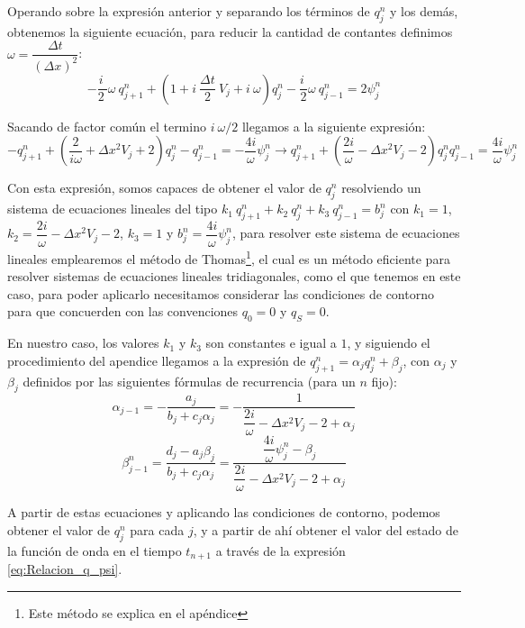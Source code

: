 \documentclass[10pt,onecolumn]{article}
\begin{document}
Operando sobre la expresión anterior y separando los términos de $q^n_j$ y los demás, obtenemos la siguiente ecuación, para reducir la cantidad de contantes definimos $\omega = \dfrac{\Delta t}{(\Delta x)^2}$:
\begin{equation}
    -\dfrac{i\ }{2\ }\omega\ q_{j+1}^{n} + (1 + i\ \dfrac{\Delta t}{2}\ V_j + i\ \omega) q_{j}^{n} - \dfrac{i\ }{2 }\omega\  q_{j-1}^{n} = 2\psi^n_j
\end{equation}

Sacando de factor común el termino $i\ \omega/2$ llegamos a la siguiente expresión:
\begin{equation}
    -q_{j+1}^{n} + (\dfrac{2}{i \omega} +\Delta x^2 V_j + 2) q_{j}^{n} - q_{j-1}^{n} = - \dfrac{4i}{\omega}\psi^n_j \rightarrow q_{j+1}^{n} + (\dfrac{2i}{\omega} -\Delta x^2 V_j - 2) q_{j}^{n}  q_{j-1}^{n} = \dfrac{4i}{\omega}\psi^n_j
\end{equation}

Con esta expresión, somos capaces de obtener el valor de $q^n_j$ resolviendo un sistema de ecuaciones lineales del tipo $k_1\ q_{j+1}^{n} + k_2\ q_{j}^{n} + k_3\ q_{j-1}^{n} = b_j^n$ con $k_1 = 1$, $k_2 = \dfrac{2i}{\omega} -\Delta x^2 V_j - 2$, $k_3 = 1$ y $b_j^n = \dfrac{4i}{\omega}\psi^n_j$, para resolver este sistema de ecuaciones lineales emplearemos el método de Thomas\footnote{Este método se explica en el apéndice}, el cual es un método eficiente para resolver sistemas de ecuaciones lineales tridiagonales, como el que tenemos en este caso, para poder aplicarlo necesitamos considerar las condiciones de contorno para que concuerden con las convenciones $q_0 = 0$ y $q_S = 0$.

En nuestro caso, los valores $k_1$ y $k_3$ son constantes e igual a $1$, y siguiendo el procedimiento del apendice llegamos a la expresión de $q^n_{j+1} = \alpha_j q^n_j + \beta_j$, con $\alpha_j$ y $\beta_j$ definidos por las siguientes fórmulas de recurrencia (para un $n$ fijo):
\begin{equation}
    \alpha_{j-1} = -\dfrac{a_j}{b_j + c_j \alpha_j} = -\dfrac{1}{\dfrac{2i}{\omega} -\Delta x^2 V_j - 2 + \alpha_j}
\end{equation}
\begin{equation}        
    \beta_{j-1}^n = \dfrac{d_j - a_j \beta_{j}}{b_j + c_j \alpha_j} = \dfrac{\dfrac{4i}{\omega}\psi^n_j - \beta_{j}}{\dfrac{2i}{\omega} -\Delta x^2 V_j - 2 + \alpha_j}
\end{equation}

A partir de estas ecuaciones y aplicando las condiciones de contorno, podemos obtener el valor de $q^n_j$ para cada $j$, y a partir de ahí obtener el valor del estado de la función de onda en el tiempo $t_{n+1}$ a través de la expresión \ref{eq:Relacion_q_psi}.
\end{document}
